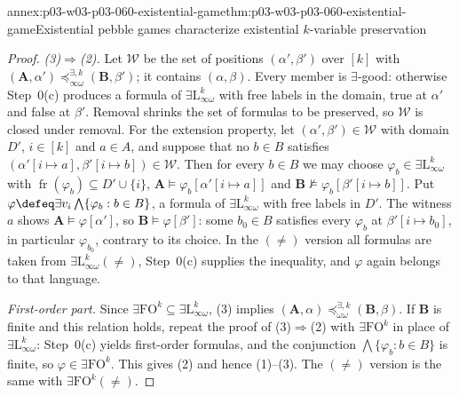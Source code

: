 \begin{annexitem}{annex:p03-w03-p03-060-existential-game}{thm:p03-w03-p03-060-existential-game}{Existential pebble games characterize existential \(k\)-variable preservation}
\begin{proof}
\emph{(3)\(\Rightarrow\)(2).} Let \(\mathcal W\) be the set of positions
\((\alpha',\beta')\) over \([k]\) with
\((\mathbf A,\alpha')\preceq^{\exists,k}_{\infty\omega}(\mathbf B,\beta')\);
it contains \((\alpha,\beta)\). Every member is \(\exists\)-good: otherwise
Step~0(c) produces a formula of \(\exists\mathrm{L}^k_{\infty\omega}\) with
free labels in the domain, true at \(\alpha'\) and false at \(\beta'\).
Removal shrinks the set of formulas to be preserved, so \(\mathcal W\) is
closed under removal. For the extension property, let
\((\alpha',\beta')\in\mathcal W\) with domain \(D'\), \(i\in[k]\) and
\(a\in A\), and suppose that no \(b\in B\) satisfies
\((\alpha'[i\mapsto a],\beta'[i\mapsto b])\in\mathcal W\). Then for every
\(b\in B\) we may choose \(\varphi_b\in\exists\mathrm{L}^k_{\infty\omega}\)
with \(\operatorname{fr}(\varphi_b)\subseteq D'\cup\{i\}\),
\(\mathbf A\models\varphi_b[\alpha'[i\mapsto a]]\) and
\(\mathbf B\not\models\varphi_b[\beta'[i\mapsto b]]\). Put
\(\varphi\defeq\exists v_i\bigwedge\{\varphi_b:b\in B\}\), a formula of
\(\exists\mathrm{L}^k_{\infty\omega}\) with free labels in \(D'\). The
witness \(a\) shows \(\mathbf A\models\varphi[\alpha']\), so
\(\mathbf B\models\varphi[\beta']\): some \(b_0\in B\) satisfies every
\(\varphi_b\) at \(\beta'[i\mapsto b_0]\), in particular \(\varphi_{b_0}\),
contrary to its choice. In the \((\neq)\) version all formulas are taken
from \(\exists\mathrm{L}^k_{\infty\omega}(\neq)\), Step~0(c) supplies the
inequality, and \(\varphi\) again belongs to that language.

\emph{First-order part.} Since \(\exists\mathrm{FO}^k\subseteq\exists\mathrm{L}^k_{\infty\omega}\),
(3) implies
\((\mathbf A,\alpha)\preceq^{\exists,k}_{\omega\omega}(\mathbf B,\beta)\).
If \(\mathbf B\) is finite and this relation holds, repeat the proof of
(3)\(\Rightarrow\)(2) with \(\exists\mathrm{FO}^k\) in place of
\(\exists\mathrm{L}^k_{\infty\omega}\): Step~0(c) yields first-order
formulas, and the conjunction \(\bigwedge\{\varphi_b:b\in B\}\) is finite,
so \(\varphi\in\exists\mathrm{FO}^k\). This gives (2) and hence (1)--(3).
The \((\neq)\) version is the same with \(\exists\mathrm{FO}^k(\neq)\).
\end{proof}
\end{annexitem}

